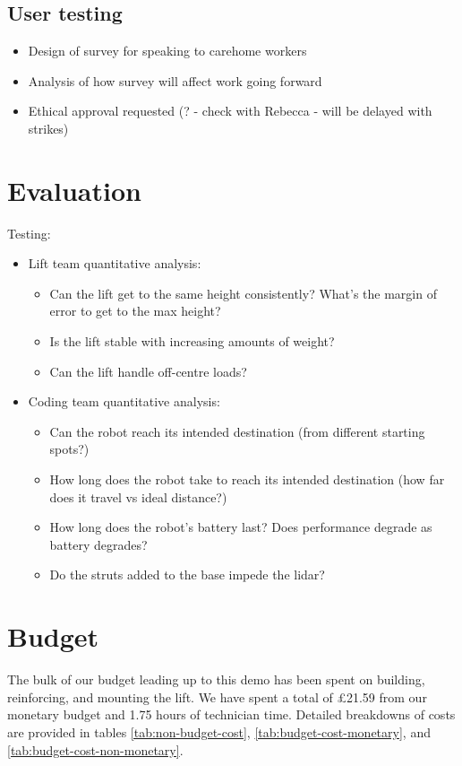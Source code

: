 \documentclass{article}
\begin{document}
\subsection{User testing}
\begin{itemize}
\item Design of survey for speaking to carehome workers
\item Analysis of how survey will affect work going forward
\item Ethical approval requested (? - check with Rebecca - will be delayed with strikes)
\end{itemize}

\section{Evaluation}
Testing:
\begin{itemize}
\item Lift team quantitative analysis:
  \begin{itemize}
  \item Can the lift get to the same height consistently? What's the margin of error to get to the max height?
  \item Is the lift stable with increasing amounts of weight?
  \item Can the lift handle off-centre loads?
  \end{itemize}
\item Coding team quantitative analysis:
  \begin{itemize}
  \item Can the robot reach its intended destination (from different starting spots?)
  \item How long does the robot take to reach its intended destination (how far does it travel vs ideal distance?)
  \item How long does the robot's battery last? Does performance degrade as battery degrades?
  \item Do the struts added to the base impede the lidar? 
  \end{itemize}
\end{itemize}
  
\section{Budget}
The bulk of our budget leading up to this demo has been spent on building, reinforcing, and mounting the lift. We have spent a total of \pounds 21.59 from our monetary budget and 1.75 hours of technician time. Detailed breakdowns of costs are provided in tables \ref{tab:non-budget-cost}, \ref{tab:budget-cost-monetary}, and \ref{tab:budget-cost-non-monetary}.
\end{document}
